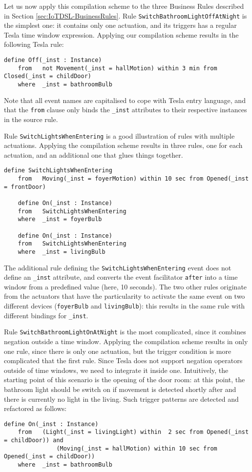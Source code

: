 Let us now apply this compilation scheme to the three Business Rules described in Section \ref{sec:IoTDSL-BusinessRules}. Rule \lstinline[language=iotdsl]{SwitchBathroomLightOffAtNight} is the simplest one: it contains only one actuation, and its triggers has a regular Tesla time window expression. Applying our compilation scheme results in the following Tesla rule:
\begin{lstlisting}[language=tesla]
	define Off(_inst : Instance)
	from   not Movement(_inst = hallMotion) within 3 min from Closed(_inst = childDoor)
	where  _inst = bathroomBulb
\end{lstlisting}
Note that all event names are capitalised to cope with Tesla entry language, and that the \lstinline[language=tesla]{from} clause only binds the \lstinline[language=tesla]{_inst} attributes to their respective instances in the source \IOTDSL rule. 

Rule \lstinline[language=iotdsl]{SwitchLightsWhenEntering} is a good illustration of \IOTDSL rules with multiple actuations. Applying the compilation scheme results in three rules, one for each actuation, and an additional one that glues things together. 
\begin{lstlisting}[language=tesla]
	define SwitchLightsWhenEntering
	from   Moving(_inst = foyerMotion) within 10 sec from Opened(_inst = frontDoor)

	define On(_inst : Instance)
	from   SwitchLightsWhenEntering
	where  _inst = foyerBulb
	
	define On(_inst : Instance)
	from   SwitchLightsWhenEntering
	where  _inst = livingBulb
\end{lstlisting}
The additional rule defining the \lstinline[language=tesla]{SwitchLightsWhenEntering} event does not define an \lstinline[language=tesla]{_inst} attribute, and converts the event facilitator \lstinline[language=iotdsl]{after} into a time window from a predefined value (here, 10 seconds). The two other rules originate from the actuators that have the particularity to activate the same event on two different devices (\lstinline[language=iotdsl]{foyerBulb} and \lstinline[language=iotdsl]{livingBulb}): this results in the same rule with different bindings for \lstinline[language=tesla]{_inst}.

Rule \lstinline[language=iotdsl]{SwitchBathroomLightOnAtNight} is the most complicated, since it combines negation outside a time window. Applying the compilation scheme results in only one rule, since there is only one actuation, but the trigger condition is more complicated that the first rule. Since Tesla does not support negation operators outside of time windows, we need to integrate it inside one. Intuitively, the starting point of this scenario is the opening of the door room: at this point, the bathroom light should be switch on if movement is detected shortly after and there is currently no light in the living. Such trigger patterns are detected and refactored as follows: 
\begin{lstlisting}[language=tesla]
	define On(_inst : Instance)
	from   (Light(_inst = livingLight) within  2 sec from Opened(_inst = childDoor)) and 
			   (Moving(_inst = hallMotion) within 10 sec from Opened(_inst = childDoor))
	where  _inst = bathroomBulb
\end{lstlisting}
